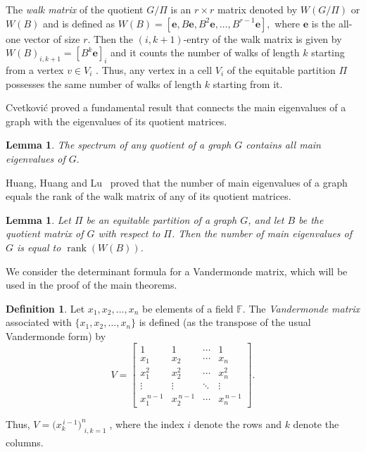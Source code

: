 \documentclass[11pt,oneside]{article}
\theoremstyle{plain}
\theoremstyle{plain}
\newtheorem{lem}[theorem]{Lemma}
\theoremstyle{definition}
\newtheorem{defi}[theorem]{Definition}
\numberwithin{figure}{section}
\theoremstyle{remark}
\numberwithin{equation}{section}
\begin{document}
	The \textit{walk matrix} of the quotient $G/\Pi$ is an $r\times r$ matrix denoted by $W(G/\Pi)$ or $W(B)$ and is defined as $W(B) = [\mathbf{e}, B\mathbf{e}, B^2\mathbf{e}, \dots, B^{r-1}\mathbf{e}],$ where $\mathbf{e}$ is the all-one vector of size $r.$ %
	Then the $(i, k + 1)$-entry of the walk matrix is given by $W(B)_{i,k+1} =[B^k\mathbf{e}]_i $ and it counts the number of walks of length $k$ starting from a vertex $v\in V_i$ \cite{rowlinson, harary}. Thus, any vertex in a cell $V_i$ of the equitable partition $\Pi$ possesses the same number of walks of length $k$ starting from it.
	
	Cvetković\cite{cvetkovic2}  proved a fundamental result that connects the main eigenvalues of a graph with the eigenvalues of its quotient matrices.
	
	\begin{lem}\textnormal{\cite{cvetkovic2}}\label{main eig of G is an eig of Quotient} 
		The spectrum of any quotient of a graph $G$ contains all main eigenvalues of $G.$
	\end{lem}
	
	
	
	Huang, Huang and Lu~\cite{huang} proved that the number of main eigenvalues of a graph equals the rank of the walk matrix of any of its quotient matrices.
	
	\begin{lem}{\normalfont\cite{huang}}\label{lem: main eigen. = rank of W(B)}
		Let $\Pi$ be an equitable partition of a graph $G$, and let $B$ be the quotient matrix of $G$ with respect to $\Pi$. Then the number of main eigenvalues of $G$ is equal to $\operatorname{rank}(W(B))$.
	\end{lem}
	
	We consider the determinant formula for a Vandermonde matrix, which will be used in the proof of the main theorems.
	
	\begin{defi}\cite{khare}
		Let $x_1, x_2, \dots, x_n$ be elements of a field $\mathbb{F}$. The \emph{Vandermonde matrix} associated with $\{x_1, x_2, \dots, x_n\}$ is defined (as the transpose of the usual Vandermonde form) by
		\[
		V=
		\begin{bmatrix}
			1 & 1 & \cdots & 1 \\
			x_1 & x_2 & \cdots & x_n \\
			x_1^{2} & x_2^{2} & \cdots & x_n^{2} \\
			\vdots & \vdots & \ddots & \vdots \\
			x_1^{\,n-1} & x_2^{\,n-1} & \cdots & x_n^{\,n-1}
		\end{bmatrix}.
		\]
		
		Thus, $
		V = \bigl(x_k^{\,i-1}\bigr)_{\substack{ i,k= 1}}^n$,
		where the index $i$ denote the rows and $k$ denote the columns.
	\end{defi}
	
\end{document}

